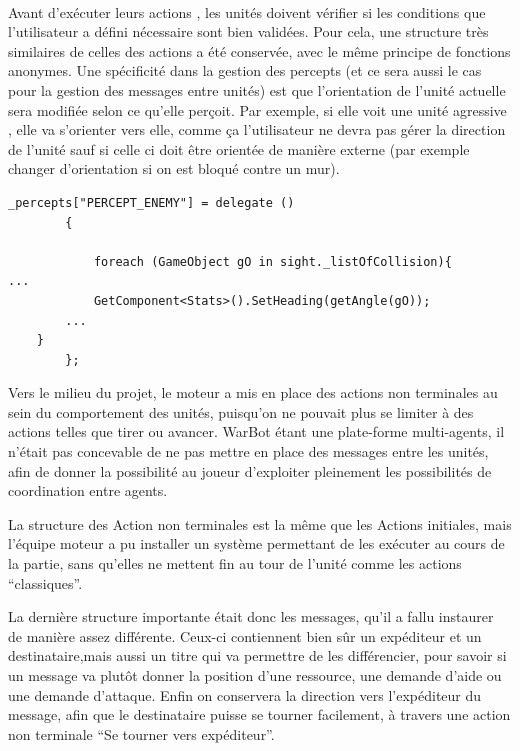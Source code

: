\documentclass{report}
\begin{document}
\paragraph{}

Avant d'exécuter leurs actions , les unités doivent vérifier si les conditions que l’utilisateur a défini nécessaire sont bien validées. Pour cela, une structure très similaires de celles des actions a été conservée, avec le même principe de fonctions anonymes. 
Une spécificité dans la gestion des percepts (et ce sera aussi le cas pour la gestion des messages entre unités) est que l’orientation de l’unité actuelle sera modifiée selon ce qu’elle perçoit. Par exemple, si elle voit une unité agressive , elle va s’orienter vers elle, comme ça l’utilisateur ne devra pas gérer la direction de l’unité sauf si celle ci doit être orientée de manière externe (par exemple changer d’orientation si on est bloqué contre un mur).

\begin{lstlisting}[frame=single]
_percepts["PERCEPT_ENEMY"] = delegate ()
        {
            
            foreach (GameObject gO in sight._listOfCollision){
...
            GetComponent<Stats>().SetHeading(getAngle(gO));
        ...
    }
        };
\end{lstlisting}

Vers le milieu du projet, le moteur a mis en place des actions non terminales au sein du comportement des unités, puisqu’on ne pouvait plus se limiter à des actions telles que tirer ou avancer. 
WarBot étant une plate-forme multi-agents, il n’était pas concevable de ne pas mettre en place des messages entre les unités, afin de donner la possibilité au joueur d’exploiter pleinement les possibilités de coordination entre agents.

La structure des Action non terminales est la même que les Actions initiales, mais l’équipe moteur a pu installer un système permettant de les exécuter au cours de la partie, sans qu’elles ne mettent fin au tour de l’unité comme les actions “classiques”.


La dernière structure importante était donc les messages, qu’il a fallu instaurer de manière assez différente.
Ceux-ci contiennent bien sûr un expéditeur et un destinataire,mais aussi un titre qui va permettre de les différencier, pour savoir si un message va plutôt donner la position d’une ressource, une demande d’aide ou une demande d’attaque. Enfin on conservera la direction vers l’expéditeur du message, afin que le destinataire puisse se tourner facilement, à travers une action non terminale “Se tourner vers expéditeur”.
\end{document}
